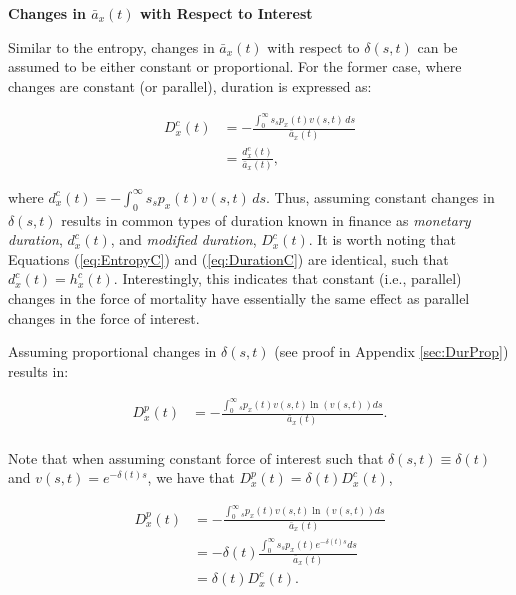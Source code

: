 \documentclass[12pt]{article}
\begin{document}
{\textbf{{Changes in $\bar{a}_x(t)$ with Respect to Interest}}


Similar to the entropy, changes in $\bar{a}_x(t)$ with respect to $\delta(s,t)$ can be assumed to be either constant or proportional. For the former case, where changes are constant (or parallel), duration is expressed as:

\begin{equation}\label{eq:DurationC}
	\begin{split}
		{D}^{c}_x(t) &= -\frac{\int_0^\infty s {}_s p_x(t) {v}(s,t) \, ds}{\bar{a}_x(t)} \\
		&= \frac{{d}^{c}_x(t)}{\bar{a}_x(t)},
	\end{split}
\end{equation}

where ${d}^{c}_x(t) = -\int_0^\infty s {}_s p_x(t) {v}(s,t) \, ds$. Thus, assuming constant changes in $\delta(s,t)$ results in common types of duration known in finance as \textit{monetary duration}, ${d}^{c}_x(t)$, and \textit{modified duration}, ${D}^{c}_x(t)$. It is worth noting that Equations (\ref{eq:EntropyC}) and (\ref{eq:DurationC}) are identical, such that ${d}^{c}_x(t) = {h}^{c}_{x}(t)$. Interestingly, this indicates that constant (i.e., parallel) changes in the force of mortality have essentially the same effect as parallel changes in the force of interest.

Assuming proportional changes in $\delta(s,t)$ (see proof in Appendix \ref{sec:DurProp}) results in: 


\begin{equation}\label{eq:DurationP}
\begin{split}
{D}^{p}_{x}(t) &= -\frac{\int_0^\infty {}_sp_x(t) v(s,t) \ln(v(s,t))ds}{\bar{a}_x(t)}. \\
\end{split}
\end{equation}


Note that when assuming constant force of interest such that $\delta(s,t) \equiv \delta(t)$ and $v(s,t)=e^{-\delta(t)s}$, we have that ${D}^{p}_{x}(t)=\delta(t){D}^{c}_{x}(t)$,


\begin{equation}\label{eq:DurationCP}
\begin{split}
{D}^{p}_{x}(t) &= -\frac{\int_0^\infty {}_sp_x(t) v(s,t) \ln(v(s,t))ds}  {\bar{a}_x(t)} \\
&=- \delta(t)\frac{\int_0^\infty s{}_sp_x(t) e^{-\delta(t)s}  ds}{\bar{a}_x(t)} \\
& = \delta(t){D}^{c}_{x}(t).
\end{split}
\end{equation}

}
\end{document}
